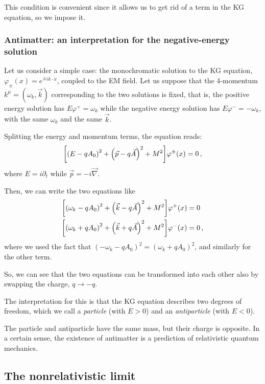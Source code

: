\documentclass[main.tex]{subfiles}
\begin{document}
This condition is convenient since it allows us to get rid of a term in the KG equation, so we impose it. 

\subsubsection{Antimatter: an interpretation for the negative-energy solution}

Let us consider a simple case: the monochromatic solution to the KG equation, \(\varphi_{\pm} (x) = e^{\mp i k \cdot x}\), coupled to the EM field.
Let us suppose that the 4-momentum \(k^{\mu} = (\omega_{k}, \vec{k})\) corresponding to the two solutions is fixed, that is, the positive energy solution has \(E \varphi^{+} = \omega_{k}\) while the negative energy solution has \(E \varphi^{-} = - \omega_{k}\), with the same \(\omega_{k}\) and the same \(\vec{k}\). 

Splitting the energy and momentum terms, the equation reads: 
%
\begin{align}
\qty[\qty(E - q A_0 )^2 + \qty(\vec{p} - q \vec{A})^2 + M^2] \varphi^{\pm}(x) = 0
\,,
\end{align}
%
where \(E = i \partial_{t} \) while \(\vec{p} = - i \vec{\nabla}\). 

Then, we can write the two equations like 
%
\begin{subequations}
\begin{align}
\qty[\qty(\omega_{k} - q A_0 )^2 + \qty(\vec{k} - q \vec{A})^2 + M^2] \varphi^{+}(x) &= 0 \\
\qty[\qty(\omega_{k} + q A_0 )^2 + \qty(\vec{k} + q \vec{A})^2 + M^2] \varphi^{-}(x) &= 0 
\,,
\end{align}
\end{subequations}
%
where we used the fact that \((-\omega_{k} - q A_0 )^2 = (\omega_{k} + q A_0 )^2\), and similarly for the other term.  

So, we can see that the two equations can be transformed into each other also by swapping the charge, \(q \rightarrow -q\). 

The interpretation for this is that the KG equation describes two degrees of freedom, which we call a \emph{particle} (with \(E>0\)) and an \emph{antiparticle} (with \(E<0\)).

The particle and antiparticle have the same mass, but their charge is opposite. 
In a certain sense, the existence of antimatter is a prediction of relativistic quantum mechanics. 

\subsection{The nonrelativistic limit}
\end{document}
